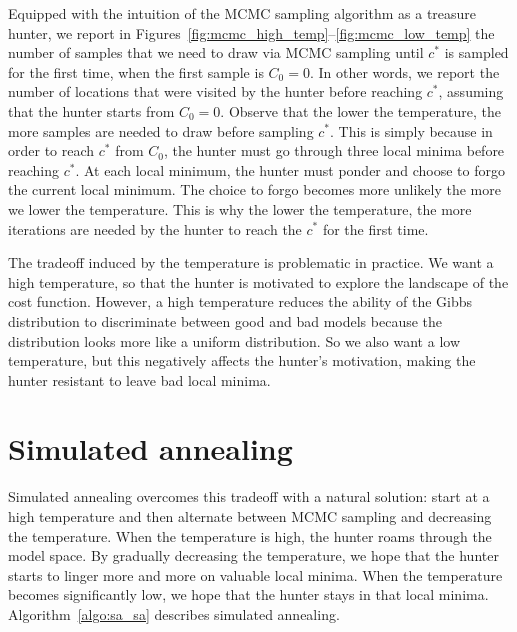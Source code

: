 Equipped with the intuition of the MCMC sampling algorithm as a treasure
hunter, we report in Figures~\ref{fig:mcmc_high_temp}--\ref{fig:mcmc_low_temp} the number of samples that
we need to draw via MCMC sampling until $c^*$ is sampled for the first time,
when the first sample is $C_0 = 0$. In other words, we report the number
of locations that were visited by the hunter before reaching $c^*$, assuming
that the hunter starts from $C_0 = 0$. Observe that the lower the temperature,
the more samples are needed to draw before sampling $c^*$. This is simply
because in order to reach $c^*$ from $C_0$, the hunter must go through three local
minima before reaching $c^*$. At each local minimum, the hunter must
ponder and choose to forgo the current local minimum. The choice to forgo
becomes more unlikely the more we lower the temperature. This is why
the lower the temperature, the more iterations are needed by the hunter to
reach the $c^*$ for the first time.

The tradeoff induced by the temperature is problematic in practice.
We want a high temperature, so that the hunter is motivated to explore
the landscape of the cost function. However, a high temperature reduces
the ability of the Gibbs distribution to discriminate between good and bad
models because the distribution looks more like a uniform distribution. So
we also want a low temperature, but this negatively affects the hunter's
motivation, making the hunter resistant to leave bad local minima.

\section{Simulated annealing}
\label{sec:simulated_annealing}

Simulated annealing overcomes this tradeoff with a natural solution: start
at a high temperature and then alternate between MCMC sampling and
decreasing the temperature. When the temperature is high, the hunter
roams through the model space. By gradually decreasing the temperature,
we hope that the hunter starts to linger more and more on valuable local
minima. When the temperature becomes significantly low, we hope that
the hunter stays in that local minima. Algorithm~\ref{algo:sa_sa} describes simulated
annealing.

